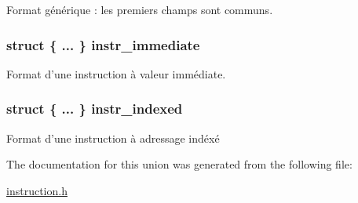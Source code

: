 \-Format générique \-: les premiers champs sont communs. 

\hypertarget{union_instruction_ad71dbb5583d6c21a4e562be0b378ff8a}{
\subsubsection[{instr\-\_\-immediate}]{\setlength{\rightskip}{0pt plus 5cm}struct \{ ... \}   {\bf instr\-\_\-immediate}}}\label{union_instruction_ad71dbb5583d6c21a4e562be0b378ff8a}


\-Format d'une instruction à valeur immédiate. 

\hypertarget{union_instruction_ab483163ca6ac7161f93c94601563ccad}{
\subsubsection[{instr\-\_\-indexed}]{\setlength{\rightskip}{0pt plus 5cm}struct \{ ... \}   {\bf instr\-\_\-indexed}}}\label{union_instruction_ab483163ca6ac7161f93c94601563ccad}


\-Format d'une instruction à adressage indéxé 



\-The documentation for this union was generated from the following file\-:\begin{DoxyCompactItemize}
\item 
\hyperlink{instruction_8h}{instruction.\-h}\end{DoxyCompactItemize}
